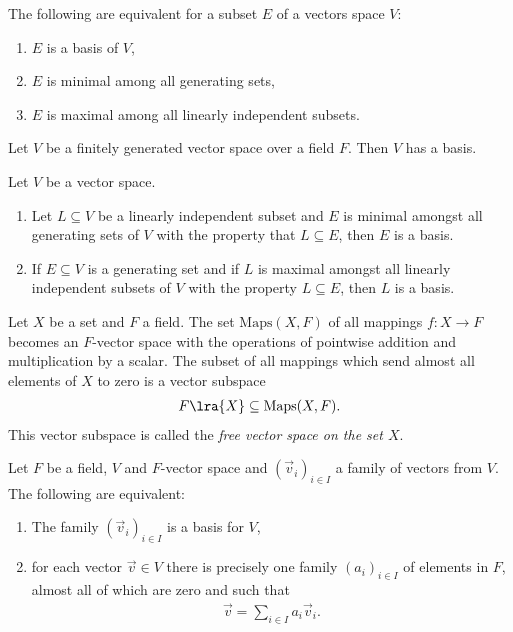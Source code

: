 \documentclass{article}
\begin{document}
\begin{theorem}[Theorem 1.5.12]
	The following are equivalent for a subset $E$ of a vectors space $V$:
	\begin{enumerate}
		\item $E$ is a basis of $V$,
		\item $E$ is minimal among all generating sets,
		\item $E$ is maximal among all linearly independent subsets.
	\end{enumerate}
\end{theorem}

\begin{corollary}[Notes 1.5.13]
	Let $V$ be a finitely generated vector space over a field $F$. Then $V$
	has a basis.
\end{corollary}

\begin{theorem}[Notes 1.5.14]
	Let $V$ be a vector space.
	\begin{enumerate}
		\item Let $L\subseteq V$ be a linearly independent subset and $E$ is minimal
		      amongst all generating sets of $V$ with the property that $L\subseteq E$,
		      then $E$ is a basis.
		\item If $E\subseteq V$ is a generating set and if $L$ is maximal amongst all
		      linearly independent subsets of $V$ with the property $L\subseteq E$, then
		      $L$ is a basis.
	\end{enumerate}
\end{theorem}

\begin{definition}
	Let $X$ be a set and $F$ a field. The set $\text{Maps}(X,F)$ of all mappings
	$f:X\to F$ becomes an $F$-vector space with the operations of pointwise
	addition and multiplication by a scalar. The subset of all mappings which send
	almost all elements of $X$ to zero is a vector subspace
	\begin{align*}
		F\lra{X}\subseteq \text{Maps}(X,F).
	\end{align*}
	This vector subspace is called the \emph{free vector space on the set $X$}.
\end{definition}

\begin{theorem}[Notes 1.5.16]
	Let $F$ be a field, $V$ and $F$-vector space and $(\vec v_i)_{i\in I}$ a
	family of vectors from $V$. The following are equivalent:
	\begin{enumerate}
		\item The family $(\vec v_i)_{i\in I}$ is a basis for $V$,
		\item for each vector $\vec v\in V$ there is precisely one family $(a_i)_{i\in I}$
		      of elements in $F$, almost all of which are zero and such that \begin{align*}
			      \vec v = \sum_{i\in I}a_i\vec v_i.
		      \end{align*}
	\end{enumerate}
\end{theorem}
\end{document}
